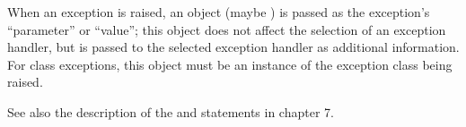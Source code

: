 When an exception is raised, an object (maybe ) is passed
as the exception's ``parameter'' or ``value''; this object does not
affect the selection of an exception handler, but is passed to the
selected exception handler as additional information.  For class
exceptions, this object must be an instance of the exception class
being raised.

See also the description of the  and 
statements in chapter 7.
